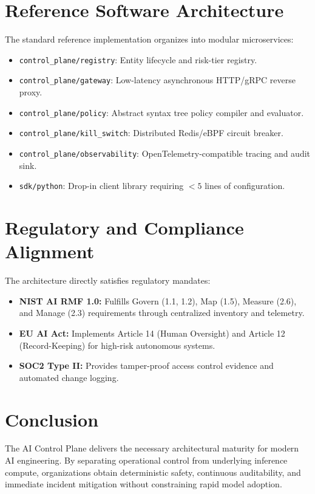 \documentclass[11pt,a4paper]{article}
\begin{document}
\section{Reference Software Architecture}
The standard reference implementation organizes into modular microservices:
\begin{itemize}
    \item \texttt{control_plane/registry}: Entity lifecycle and risk-tier registry.
    \item \texttt{control_plane/gateway}: Low-latency asynchronous HTTP/gRPC reverse proxy.
    \item \texttt{control_plane/policy}: Abstract syntax tree policy compiler and evaluator.
    \item \texttt{control_plane/kill_switch}: Distributed Redis/eBPF circuit breaker.
    \item \texttt{control_plane/observability}: OpenTelemetry-compatible tracing and audit sink.
    \item \texttt{sdk/python}: Drop-in client library requiring $< 5$ lines of configuration.
\end{itemize}

\section{Regulatory and Compliance Alignment}
The architecture directly satisfies regulatory mandates:
\begin{itemize}
    \item \textbf{NIST AI RMF 1.0:} Fulfills Govern (1.1, 1.2), Map (1.5), Measure (2.6), and Manage (2.3) requirements through centralized inventory and telemetry.
    \item \textbf{EU AI Act:} Implements Article 14 (Human Oversight) and Article 12 (Record-Keeping) for high-risk autonomous systems.
    \item \textbf{SOC2 Type II:} Provides tamper-proof access control evidence and automated change logging.
\end{itemize}

\section{Conclusion}
The AI Control Plane delivers the necessary architectural maturity for modern AI engineering. By separating operational control from underlying inference compute, organizations obtain deterministic safety, continuous auditability, and immediate incident mitigation without constraining rapid model adoption.



\end{document}
